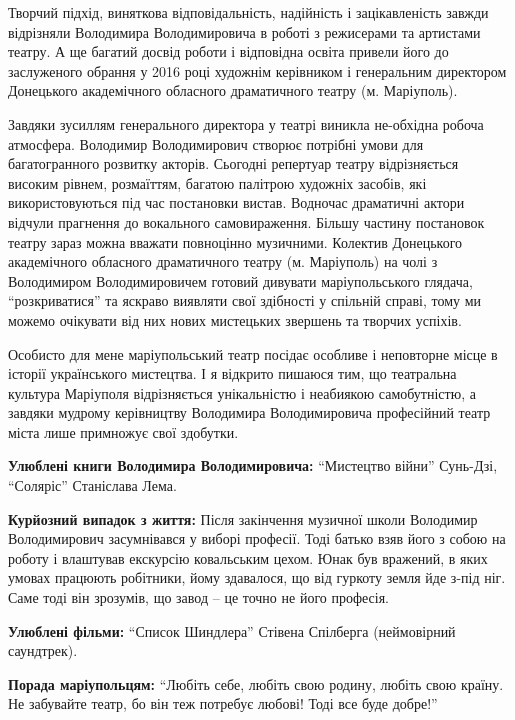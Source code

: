 
Творчий підхід, виняткова відповідальність, надійність і зацікавленість завжди
відрізняли Володимира Володимировича в роботі з режисерами та артистами театру.
А ще багатий досвід роботи і відповідна освіта привели його до заслуженого
обрання у 2016 році художнім керівником і генеральним директором Донецького
академічного обласного драматичного театру (м. Маріуполь).


Завдяки зусиллям генерального директора у театрі виникла не\hyp{}обхідна робоча
атмосфера. Володимир Володимирович створює потрібні умови для багатогранного
розвитку акторів. Сьогодні репертуар театру відрізняється високим рівнем,
розмаїттям, багатою палітрою художніх засобів, які використовуються під час
постановки вистав. Водночас драматичні актори відчули прагнення до вокального
самовираження. Більшу частину постановок театру зараз можна вважати повноцінно
музичними. Колектив Донецького академічного обласного драматичного театру (м.
Маріуполь) на чолі з Володимиром Володимировичем готовий дивувати
маріупольського глядача, \enquote{розкриватися} та яскраво виявляти свої здібності у
спільній справі, тому ми можемо очікувати від них нових мистецьких звершень та
творчих успіхів.


Особисто для мене маріупольський театр посідає особливе і неповторне місце в
історії українського мистецтва. І я відкрито пишаюся тим, що театральна
культура Маріуполя відрізняється унікальністю і неабиякою самобутністю, а
завдяки мудрому керівництву Володимира Володимировича професійний театр міста
лише примножує свої здобутки.


\textbf{Улюблені книги Володимира Володимировича:} \enquote{Мистецтво війни} Сунь-Дзі, \enquote{Соляріс}
Станіслава Лема.


\textbf{Курйозний випадок з життя:} Після закінчення музичної школи Володимир
Володимирович засумнівався у виборі професії. Тоді батько взяв його з собою на
роботу і влаштував екскурсію ковальським цехом. Юнак був вражений, в яких
умовах працюють робітники, йому здавалося, що від гуркоту земля йде з-під ніг.
Саме тоді він зрозумів, що завод – це точно не його професія.

\textbf{Улюблені фільми:} \enquote{Список Шиндлера} Стівена Спілберга (неймовірний саундтрек).

\textbf{Порада маріупольцям:} \enquote{Любіть себе, любіть свою родину, любіть свою країну. Не
забувайте театр, бо він теж потребує любові! Тоді все буде добре!}

